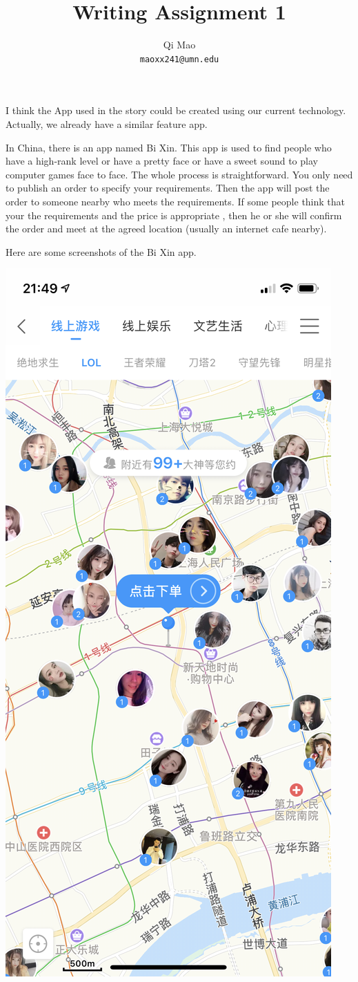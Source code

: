 \documentclass{article}
\title{Writing Assignment 1}
\author{Qi Mao\\
  \texttt{maoxx241@umn.edu}}
\begin{document}
I think the App used in the story could be created using our current technology.
Actually, we already have a similar feature app. 


In China, there is an app named Bi Xin.
This app is used to find people who have a high-rank level or have a pretty face or have a sweet sound
to play computer games face to face.
The whole process is straightforward. You only need to publish an order to specify your requirements.
Then the app will post the order to someone nearby who meets the requirements.
If some people think that your the requirements and the price is appropriate
, then he or she will confirm the order and meet at the agreed location (usually an internet cafe nearby).


Here are some screenshots of the Bi Xin app.
\begin{center}
\includegraphics[scale=0.09]{IMG_5883}
\end{center}
\end{document}
